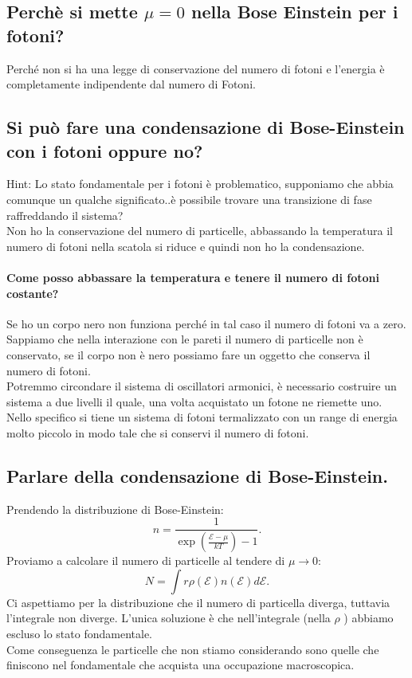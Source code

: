\subsection{Perchè si mette $\mu =0$ nella Bose Einstein per i fotoni?}%
\label{sub:Perchè si mette mu =0 nella Bose Einstein per i foo}
Perché non si ha una legge di conservazione del numero di fotoni e l'energia è completamente indipendente dal numero di Fotoni.
\subsection{Si può fare una condensazione di Bose-Einstein con i fotoni oppure no?}%
Hint: Lo stato fondamentale per i fotoni è problematico, supponiamo che abbia comunque un qualche significato..è possibile trovare una transizione di fase raffreddando il sistema?\\
Non  ho la conservazione del numero di particelle, abbassando la temperatura il numero di fotoni nella scatola si riduce e quindi non ho la condensazione.
\paragraph{Come posso abbassare la temperatura e tenere il numero di fotoni costante?}%
\label{par:Come posso abbassare la temperatura e tenere il numero di fotoni costante?}
Se ho un corpo nero non funziona perché in tal caso il numero di fotoni va a zero.
Sappiamo che nella interazione con le pareti il numero di particelle non è conservato, se il corpo non è nero possiamo fare un oggetto che conserva il numero di fotoni.\\
Potremmo circondare il sistema di oscillatori armonici, è necessario costruire un sistema a due livelli il quale, una volta acquistato un fotone ne riemette uno.\\
Nello specifico si tiene un sistema di fotoni termalizzato con un range di energia molto piccolo in modo tale che si conservi il numero di fotoni.
\subsection{Parlare della condensazione di Bose-Einstein.}%
\label{sub:Parlare della condensazione di Bose-Einstein.}
Prendendo la distribuzione di Bose-Einstein:
\[
    n = \frac{1}{\exp\left(\frac{\mathcal{E}-\mu}{kT}\right)-1}
.\] 
Proviamo a calcolare il numero di particelle al tendere di $\mu\to 0$:
\[
    N = \int r \rho (\mathcal{E}) n(\mathcal{E}) d\mathcal{E}
.\] 
Ci aspettiamo per la distribuzione che il numero di particella diverga, tuttavia l'integrale non diverge. L'unica soluzione è che nell'integrale (nella $\rho$ ) abbiamo escluso lo stato fondamentale. \\
Come conseguenza le particelle che non stiamo considerando sono quelle che finiscono nel fondamentale che acquista una occupazione macroscopica.
